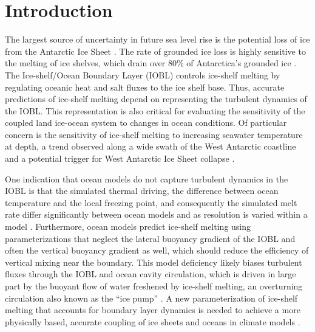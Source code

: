 \documentclass[draft]{styles/agujournal2019}
\begin{document}
\section{Introduction}

The largest source of uncertainty in future sea level rise is the potential loss of ice from the Antarctic Ice Sheet \cite{ipcc_climate_2014}. The rate of grounded ice loss is highly sensitive to the melting of ice shelves, which drain over 80\% of Antarctica’s grounded ice \cite{reese_far_2018, rignot_ice-shelf_2013}. The Ice-shelf/Ocean Boundary Layer (IOBL) controls ice-shelf melting by regulating oceanic heat and salt fluxes to the ice shelf base. Thus, accurate predictions of ice-shelf melting depend on representing the turbulent dynamics of the IOBL. This representation is also critical for evaluating the sensitivity of the coupled land ice-ocean system to changes in ocean conditions. Of particular concern is the sensitivity of ice-shelf melting to increasing seawater temperature at depth, a trend observed along a wide swath of the West Antarctic coastline and a potential trigger for West Antarctic Ice Sheet collapse \cite{ruan_ice-shelf_2021, schmidtko_multidecadal_2014, purkey_unabated_2018, wahlin_pathways_2021}. 

One indication that ocean models do not capture turbulent dynamics in the IOBL is that the simulated thermal driving, the difference between ocean temperature and the local freezing point, and consequently the simulated melt rate differ significantly between ocean models and as resolution is varied within a model \cite{gwyther_cold_2020}. Furthermore, ocean models predict ice-shelf melting using parameterizations that neglect the lateral buoyancy gradient of the IOBL and often the vertical buoyancy gradient as well, which should reduce the efficiency of vertical mixing near the boundary. This model deficiency likely biases turbulent fluxes through the IOBL and ocean cavity circulation, which is driven in large part by the buoyant flow of water freshened by ice-shelf melting, an overturning circulation also known as the ``ice pump'' \cite{webber_impact_2018}. A new parameterization of ice-shelf melting that accounts for boundary layer dynamics is needed to achieve a more physically based, accurate coupling of ice sheets and oceans in climate models \cite{gwyther_cold_2020, dinniman_modeling_2016, naughten_future_2018, edwards_projected_2021}.
\end{document}
